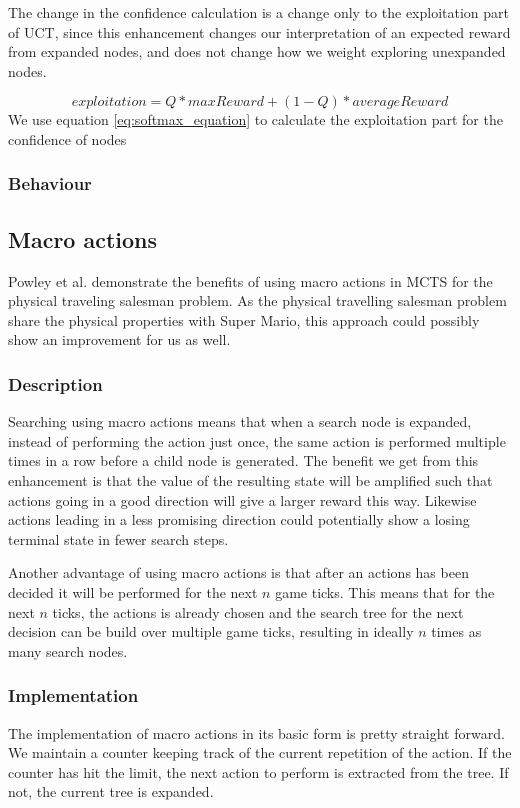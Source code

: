 \documentclass[10pt,a4paper]{article}
\begin{document}
The change in the confidence calculation is a change only to the exploitation part of UCT, since this enhancement changes our interpretation of an expected reward from expanded nodes, and does not change how we weight exploring unexpanded nodes.

\begin{equation}\label{eq:softmax_equation}
exploitation = Q * maxReward + (1 - Q ) * averageReward
\end{equation}
We use equation \ref{eq:softmax_equation} to calculate the exploitation part for the confidence of nodes

\subsubsection{Behaviour}

\subsection{Macro actions}
\label{macro}
Powley et al. demonstrate the benefits of using macro actions in MCTS for the physical traveling salesman problem\cite{salesman}. As the physical travelling salesman problem share the physical properties with Super Mario, this approach could possibly show an improvement for us as well.

\subsubsection{Description}
Searching using macro actions means that when a search node is expanded, instead of performing the action just once, the same action is performed multiple times in a row before a child node is generated.
The benefit we get from this enhancement is that the value of the resulting state will be amplified such that actions going in a good direction will give a larger reward this way. Likewise actions leading in a less promising direction could potentially show a losing terminal state in fewer search steps.

Another advantage of using macro actions is that after an actions has been decided it will be performed for the next $n$ game ticks. This means that for the next $n$ ticks, the actions is already chosen and the search tree for the next decision can be build over multiple game ticks, resulting in ideally $n$ times as many search nodes.

\subsubsection{Implementation} %
The implementation of macro actions in its basic form is pretty straight forward. We maintain a counter keeping track of the current repetition of the action. If the counter has hit the limit, the next action to perform is extracted from the tree. If not, the current tree is expanded.
\end{document}
